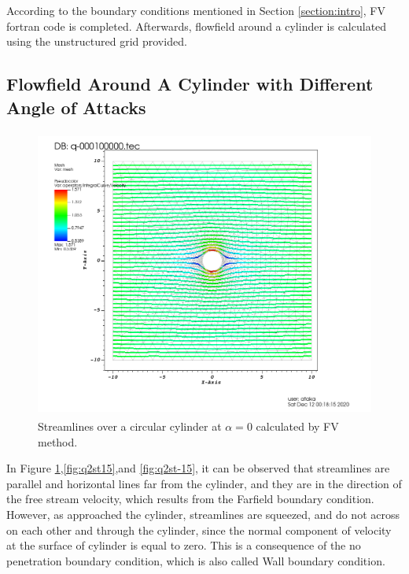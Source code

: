 \documentclass[letterpaper,12pt]{article}
\begin{document}
\vspace{1cm}

According to the boundary conditions mentioned in Section \ref{section:intro}, FV fortran code
is completed. Afterwards, flowfield around a cylinder is calculated using the unstructured grid provided.

\newpage

\subsection{Flowfield Around A Cylinder with Different Angle of Attacks}
\begin{figure} [ht]
	\centering
	\includegraphics[height = 9.5cm]{graph/0deg/Cylinder_0angle_streamline0000.png}
	\caption{Streamlines over a circular cylinder at $\alpha=0$ calculated by FV method.}
    \label{fig:q2st0}
\end{figure}

\vspace{1cm}

In Figure \ref{fig:q2st0},\ref{fig:q2st15},and \ref{fig:q2st-15}, it can be observed that streamlines 
are parallel and horizontal lines far from the cylinder, and they are in the direction of the free stream velocity,
which results from the Farfield boundary condition. However, as approached the cylinder, streamlines are squeezed,
and do not across on each other and through the cylinder, since the normal component of velocity at 
the surface of cylinder is equal to zero. This is a consequence of the no penetration boundary condition, which
is also called Wall boundary condition.

\newpage
\end{document}
